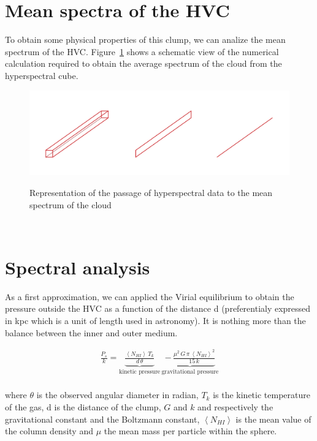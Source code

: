 \documentclass[a4paper,10.5pt]{report}
\begin{document}
\section{Mean spectra of the HVC}
To obtain some physical properties of this clump, we can analize the mean spectrum of the HVC.
Figure~\ref{fig::spectra} shows a schematic view of the numerical calculation required to obtain the average spectrum of the cloud
from the hyperspectral cube. 

\begin{figure}[h!]
  \centering
  \includegraphics[width=6.in]{spectra.png}
  \label{fig::spectra}
  \caption{Representation of the passage of hyperspectral data to the mean spectrum of the cloud}
\end{figure} \\

\section{Spectral analysis}
As a first approximation, we can applied the Virial equilibrium to obtain the pressure outside the HVC as a function
of the distance d (preferentialy expressed in kpc which is a unit of length used in astronomy). 
It is nothing more than the balance between the inner and outer medium.

\begin{align}
  \frac{P_s}{k} = \underbrace{\frac{\left< N_{HI} \right> \, T_k}{d \, \theta}}_\text{kinetic pressure} \,  
  \underbrace{- \, \frac{\mu^2 \, G \, \pi \, \left< N_{HI} \right>^2}{15 \, k}}_\text{gravitational pressure}
\end{align}  \\
where $\theta$ is the observed angular diameter in radian, $T_k$ is the kinetic temperature of the gas, d is the distance of the clump, 
$G$ and $k$ and respectively the gravitational constant and the Boltzmann constant, $\left< N_{HI} \right>$ is the mean value 
of the column density and $\mu$ the mean mass per particle within the sphere. \\
\end{document}
